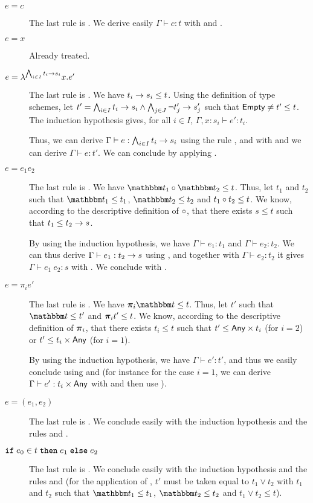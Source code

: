 \documentclass[a4paper]{article}
\theoremstyle{definition}
\begin{document}
  \begin{description}
    \item[$e=c$] The last rule is . We derive easily $\Gamma \vdash c:t$ with  and .
    \item[$e=x$] Already treated.
    \item[$e=\lambda^{\bigwedge_{i\in I} t_i\to s_i}x.e'$]
    The last rule is .
    We have $t_i\to s_i \leq t$.
    Using the definition of type schemes, let $t'=\bigwedge_{i\in I} t_i\to s_i \land \bigwedge_{j\in J} \neg t'_j\to s'_j$ such that $\textsf{Empty} \neq t' \leq t$.
    The induction hypothesis gives, for all $i\in I$, $\Gamma,x:s_i\vdash e':t_i$.
    
    Thus, we can derive $\Gamma\vdash e:\bigwedge_{i\in I} t_i\to s_i$ using the rule , and with  and
     we can derive $\Gamma\vdash e:t'$. We can conclude by applying .
    \item[$e=e_1 e_2$] The last rule is .
    We have $\apply {\ts_1} {\ts_2} \leq t$. Thus, let $t_1$ and $t_2$ such that $\ts_1 \leq t_1$, $\ts_2 \leq t_2$ and $t_1\circ t_2 \leq t$.
    We know, according to the descriptive definition of $\circ$, that there exists $s\leq t$ such that $t_1 \leq t_2\to s$.

    By using the induction hypothesis, we have $\Gamma\vdash e_1:t_1$ and $\Gamma\vdash e_2:t_2$. We can thus derive
    $\Gamma\vdash e_1:t_2\to s$ using , and together with $\Gamma\vdash e_2:t_2$ it gives
    $\Gamma\vdash e_1\ e_2:s$ with . We conclude with .

    \item[$e=\pi_i e'$] The last rule is . We have $\bpi_i \ts \leq t$. Thus, let $t'$ such that $\ts \leq t'$ and $\boldsymbol{\pi}_i t' \leq t$.
    We know, according to the descriptive definition of $\boldsymbol{\pi}_i$, that there exists $t_i\leq t$ such that $t' \leq \textsf{Any}\times t_i$ (for $i=2$) or $t' \leq t_i\times \textsf{Any}$ (for $i=1$).
    
    By using the induction hypothesis, we have $\Gamma\vdash e':t'$, and thus we easily conclude using  and 
    (for instance for the case $i=1$, we can derive $\Gamma\vdash e':t_i\times \textsf{Any}$ with  and then use ).

    \item[$e=(e_1,e_2)$] The last rule is . We conclude easily with the induction hypothesis and the rules  and .

    \item[$\texttt{if}\;e_0\in t\;\texttt{then}\;e_1\;\texttt{else}\;e_2$] The last rule is . We conclude easily with the induction hypothesis and the rules
     and  (for the application of , $t'$ must be taken equal to $t_1 \vee t_2$ with $t_1$ and $t_2$ such that $\ts_1\leq t_1$, $\ts_2\leq t_2$ and $t_1 \vee t_2 \leq t$).
  \end{description}\ \\
\end{document}
